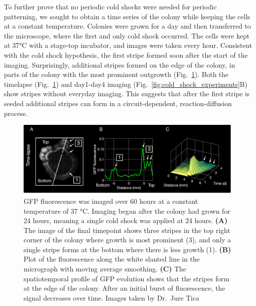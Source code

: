 To further prove that no periodic cold shocks were needed for periodic patterning, we sought to obtain a time series of the colony while keeping the cells at a constant temperature.
Colonies were grown for a day and then transferred to the microscope, where the first and only cold shock occurred.
The cells were kept at 37°C with a stage-top incubator, and images were taken every hour.
Consistent with the cold shock hypothesis, the first stripe formed soon after the start of the imaging.
Surprisingly, additional stripes formed on the edge of the colony, in parts of the colony with the most prominent outgrowth (Fig.~\ref{fig:microscopy_timeseries}).
Both the timelapse (Fig.~\ref{fig:microscopy_timeseries}) and day1-day4 imaging (Fig.~\ref{fig:cold_shock_experiments}B) show stripes without everyday imaging.
This suggests that after the first stripe is seeded additional stripes can form in a circuit-dependent, reaction-diffusion process.


\begin{figure}[H] %
    \centering
    \begin{adjustbox}{center}
        \includegraphics[width=1\textwidth]{chapters/Chapter 3/microscopy_timeseries} %
    \end{adjustbox}
    \caption{GFP fluorescence was imaged over 60 hours at a constant temperature of 37 °C. Imaging began after the colony had grown for 24 hours, meaning a single cold shock was applied at 24 hours. \textbf{(A)} The image of the final timepoint shows three stripes in the top right corner of the colony where growth is most prominent (3), and only a single stripe forms at the bottom where there is less growth (1). \textbf{(B)} Plot of the fluorescence along the white slanted line in the micrograph with moving average smoothing. \textbf{(C)} The spatiotemporal profile of GFP evolution shows that the stripes form at the edge of the colony. After an initial burst of fluorescence, the signal decreases over time. Images taken by Dr.~Jure Tica}
    \label{fig:microscopy_timeseries}
\end{figure}



